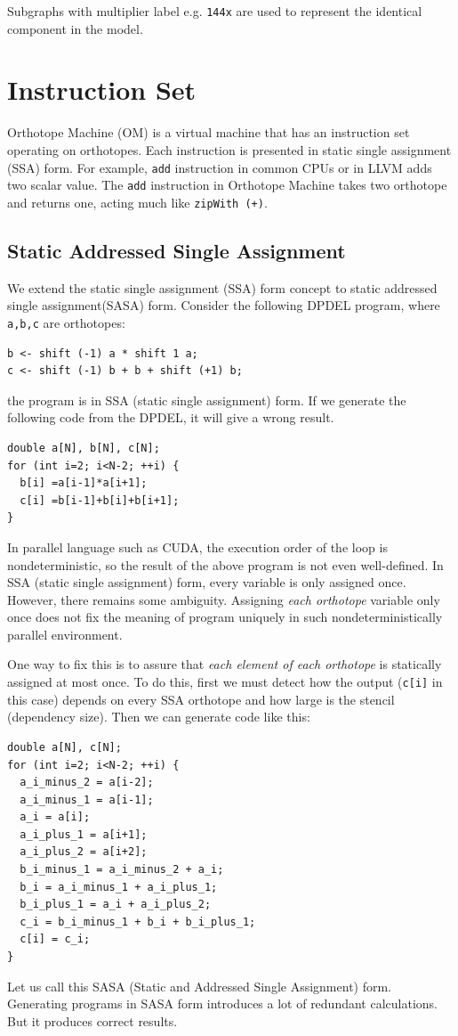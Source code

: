 \documentclass[twocolumn]{article}
\begin{document}
Subgraphs with multiplier label e.g. {\tt 144x} are used to represent the
identical component in the model.


\section{Instruction Set}

Orthotope Machine (OM) is a virtual machine that has an instruction set
operating on orthotopes. Each instruction is presented in static single
assignment (SSA) form. For example, {\tt add} instruction in common CPUs or in
LLVM adds two scalar value. The {\tt add} instruction in Orthotope Machine
takes two orthotope and returns one, acting much like {\tt zipWith (+)}.

\subsection{Static Addressed Single Assignment}

We extend the static single assignment (SSA) form concept to static addressed
single assignment(SASA) form.  Consider the following DPDEL program, where
{\tt a,b,c} are orthotopes:
\begin{verbatim}
b <- shift (-1) a * shift 1 a;
c <- shift (-1) b + b + shift (+1) b;
\end{verbatim}
the program is in SSA (static single assignment) form.
If we generate the following code from the DPDEL, it will give a wrong result.
\begin{verbatim}
double a[N], b[N], c[N];
for (int i=2; i<N-2; ++i) {
  b[i] =a[i-1]*a[i+1];
  c[i] =b[i-1]+b[i]+b[i+1];
}
\end{verbatim}
In parallel language such as CUDA, the execution order of the loop is
nondeterministic, so the result of the above program is not even
well-defined. In SSA (static single assignment) form, every variable is only
assigned once. However, there remains some ambiguity.  Assigning {\em each
  orthotope} variable only once does not fix the meaning of program uniquely
in such nondeterministically parallel environment.

One way to fix this is to assure that {\em each element of each orthotope} is
statically assigned at most once. To do this, first we must detect how the
output ({\tt c[i]} in this case) depends on every SSA orthotope and how large
is the stencil (dependency size). Then we can generate code like this:
\begin{verbatim}
double a[N], c[N];
for (int i=2; i<N-2; ++i) {
  a_i_minus_2 = a[i-2];
  a_i_minus_1 = a[i-1];
  a_i = a[i];
  a_i_plus_1 = a[i+1];
  a_i_plus_2 = a[i+2];
  b_i_minus_1 = a_i_minus_2 + a_i;
  b_i = a_i_minus_1 + a_i_plus_1;
  b_i_plus_1 = a_i + a_i_plus_2;
  c_i = b_i_minus_1 + b_i + b_i_plus_1;
  c[i] = c_i;
}
\end{verbatim}
Let us call this SASA (Static and Addressed Single Assignment)
form. Generating programs in SASA form introduces a lot of redundant
calculations. But it produces correct results.
\end{document}
